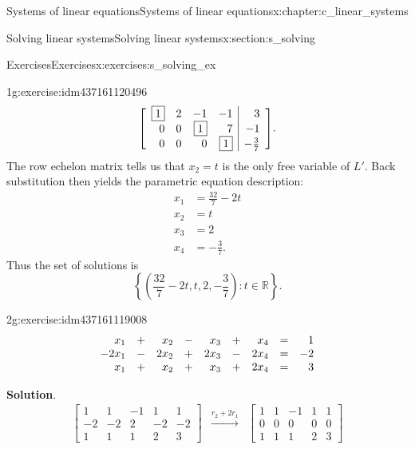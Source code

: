 \documentclass[oneside,10pt,]{book}
\makeatletter
\newcommand{\blocktitlefont}{\relax}
\numberwithin{equation}{section}
\newcommand{\R}{{\mathbb R}}
\newenvironment{amatrix}[1][ccc|c]{\left[\begin{array}{#1}}{\end{array}\right]}
\newenvironment{linsys}[2][m]{
\begin{array}[#1]{@{}*{#2}{rc}r@{}}
}{
\end{array}}
\newcommand{\amp}{&}
\makeatother
\begin{document}
\begin{chapterptx}{Systems of linear equations}{}{Systems of linear equations}{}{}{x:chapter:c_linear_systems}
\begin{sectionptx}{Solving linear systems}{}{Solving linear systems}{}{}{x:section:s_solving}
\begin{exercises-subsection-numberless}{Exercises}{}{Exercises}{}{}{x:exercises:s_solving_ex}
\begin{exercisegroup}
\begin{divisionexerciseeg}{1}{}{}{g:exercise:idm437161120496}
\begin{equation*}
\begin{amatrix}[rrrr|r]\boxed{1}\amp 2\amp -1\amp -1\amp 3\\ 0\amp 0\amp \boxed{1}\amp 7\amp -1\\ 0\amp 0\amp 0\amp \boxed{1}\amp -\frac{3}{7} \end{amatrix}\text{.}
\end{equation*}
The row echelon matrix tells us that \(x_2=t\) is the only free variable of \(L'\). Back substitution then yields the parametric equation description:%
\begin{align*}
x_1\amp = \frac{32}{7}-2t\\
x_2\amp = t\\
x_3\amp = 2\\
x_4\amp = -\frac{3}{7}\text{.}
\end{align*}
Thus the set of solutions is%
\begin{equation*}
\left\{ \left(\frac{32}{7}-2t, t, 2, -\frac{3}{7}\right)\colon t\in \R\right\}\text{.}
\end{equation*}
%
\end{divisionexerciseeg}%
\begin{divisionexerciseeg}{2}{}{}{g:exercise:idm437161119008}%
%
\begin{equation*}
\begin{linsys}{4} x_1\amp +\amp x_2\amp -\amp x_3\amp +\amp x_4\amp =\amp 1\\ -2x_1\amp -\amp 2x_2\amp +\amp 2x_3\amp -\amp 2x_4\amp =\amp -2\\ x_1\amp +\amp x_2\amp +\amp x_3\amp +\amp 2x_4\amp =\amp 3 \end{linsys}
\end{equation*}
%
\par\smallskip%
\noindent\textbf{\blocktitlefont Solution}.\hypertarget{g:solution:idm437161113296}{}\quad{}%
\begin{align*}
\begin{bmatrix}1\amp 1\amp -1\amp 1\amp 1\\ -2\amp -2\amp 2\amp -2\amp -2\\ 1\amp 1\amp 1\amp 2\amp 3 \end{bmatrix} \amp \xrightarrow[\hspace{35pt}]{r_2+2r_1}\amp \begin{bmatrix}1\amp 1\amp -1\amp 1\amp 1\\ 0\amp 0\amp 0\amp 0\amp 0\\ 1\amp 1\amp 1\amp 2\amp 3 \end{bmatrix}\\

\end{align*}
\end{divisionexerciseeg}
\end{exercisegroup}
\end{exercises-subsection-numberless}
\end{sectionptx}
\end{chapterptx}
\end{document}
